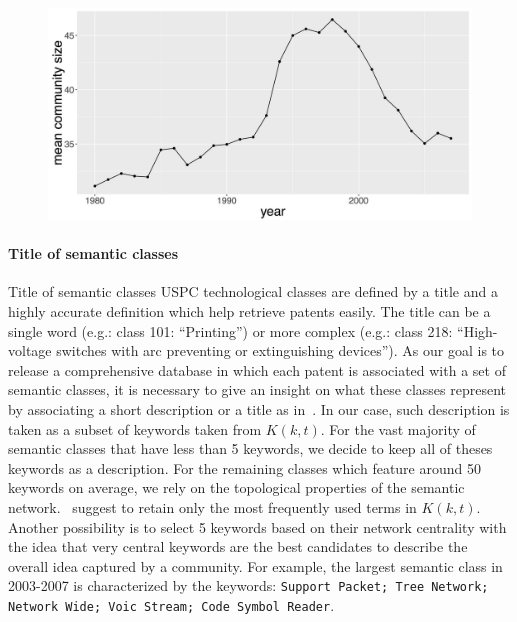 \begin{figure}
\includegraphics[width=\linewidth]{Figures/Final/C-patentsmining-mean_K}
\label{fig:patentsmining:mean_K}
\end{figure}



\paragraph*{Title of semantic classes}{Title of semantic classes}
USPC technological classes are defined by a title and a highly accurate definition which help retrieve patents easily. The title can be a single word (e.g.: class 101: ``Printing'') or more complex (e.g.: class 218: ``High-voltage switches with arc preventing or extinguishing devices''). As our goal is to release a comprehensive database in which each patent is associated with a set of semantic classes, it is necessary to give an insight on what these classes represent by associating a short description or a title as in~\cite{tseng2007text}. In our case, such description is taken as a subset of keywords taken from $K(k,t)$. For the vast majority of semantic classes that have less than 5 keywords, we decide to keep all of theses keywords as a description. For the remaining classes which feature around 50 keywords on average, we rely on the topological properties of the semantic network.~\cite{yang2000improving} suggest to retain only the most frequently used terms in $K(k,t)$. Another possibility is to select 5 keywords based on their network centrality with the idea that very central keywords are the best candidates to describe the overall idea captured by a community. For example, the largest semantic class in 2003-2007 is characterized by the keywords: \texttt{Support Packet; Tree Network; Network Wide; Voic Stream; Code Symbol Reader}.

